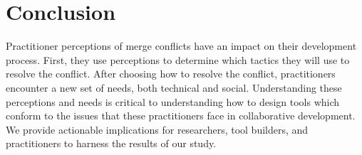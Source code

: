 \section{Conclusion}\label{conclusion}
Practitioner perceptions of merge conflicts have an impact on their development process. First, they use perceptions to determine which tactics they will use to resolve the conflict.
After choosing how to resolve the conflict, practitioners encounter a new set of needs, both technical and social. 
Understanding these perceptions and needs is critical to understanding how to design tools which conform to the issues that these practitioners face in collaborative development.
We provide actionable implications for researchers, tool builders, and practitioners to harness the results of our study.

%
%
